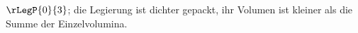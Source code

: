 $\rLegP{0}{3}$; die Legierung ist dichter gepackt, ihr Volumen ist kleiner als die Summe der Einzelvolumina.
